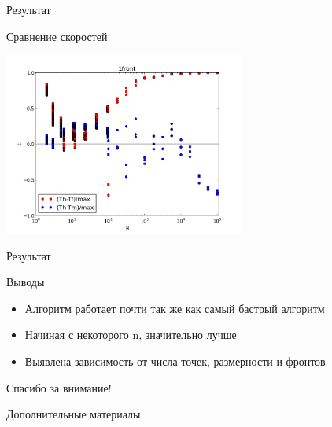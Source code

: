 \documentclass{beamer}
\begin{document}
\begin{frame}{Результат}
\begin{block}{Сравнение скоростей}
\begin{center}
\includegraphics*[height=6cm]{pic/result.png}
\end{center}
\end{block}
\end{frame}


\begin{frame}{Результат}
\begin{block}{Выводы}
\begin{itemize}
\item {Алгоритм работает почти так же как самый бастрый алгоритм}
\item {Начиная с некоторого n, значительно лучше}
\item {Выявлена зависимость от числа точек, размерности и фронтов}
\end{itemize}
\end{block}
\end{frame}

\begin{frame}{}
\begin{center}
Спасибо за внимание!
\end{center}
\end{frame}

\appendix

\begin{frame}{Дополнительные материалы}

\end{frame}
\end{document}
